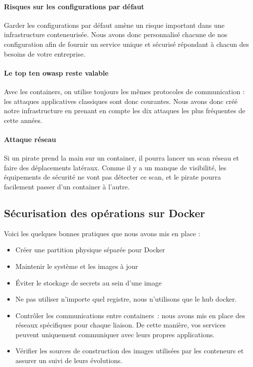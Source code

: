 \paragraph{Risques sur les configurations par défaut}

Garder les configurations par défaut amène un risque important dans une
infrastructure conteneurisée. Nous avons donc personnalisé chacune de
nos configuration afin de fournir un service unique et sécurisé
répondant à chacun des besoins de votre entreprise.

\paragraph{Le top ten owasp reste valable}

Avec les containers, on utilise toujours les mêmes protocoles de
communication : les attaques applicatives classiques sont donc
courantes. Nous avons donc créé notre infrastructure en prenant en
compte les dix attaques les plus fréquentes de cette années.

\paragraph{Attaque réseau}

Si un pirate prend la main sur un container, il pourra lancer un scan
réseau et faire des déplacements latéraux. Comme il y a un manque de
visibilité, les équipements de sécurité ne vont pas détecter ce scan, et
le pirate pourra facilement passer d'un container à l'autre.

\subsection{Sécurisation des opérations sur Docker}

Voici les quelques bonnes pratiques que nous avons mis en place :

\begin{itemize}
\item
  Créer une partition physique séparée pour Docker
\item
  Maintenir le système et les images à jour
\item
  Éviter le stockage de secrets au sein d'une image
\item
  Ne pas utiliser n'importe quel registre, nous n'utilisons que le hub
  docker.
\item
  Contrôler les communications entre containers~: nous avons mis en
  place des réseaux spécifiques pour chaque liaison. De cette manière,
  vos services peuvent uniquement communiquer avec leurs propres
  applications.
\item
  Vérifier les sources de construction des images utilisées par les
  conteneurs et assurer un suivi de leurs évolutions.
\end{itemize}


